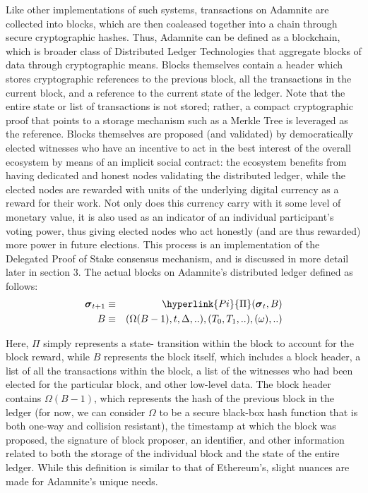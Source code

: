 \documentclass[conference]{IEEEtran}
\begin{document}
Like other implementations of such systems, transactions on Adamnite are collected into blocks, which are then coaleased together into a chain through secure cryptographic hashes. Thus, Adamnite can be defined as a blockchain, which is broader class of Distributed Ledger Technologies that aggregate blocks of data through cryptographic means.  Blocks themselves contain a header which stores cryptographic references to the previous block, all the transactions in the current block, and a reference to the current state of the ledger. Note that the entire state or list of transactions is not stored; rather, a compact cryptographic proof that points to a storage mechanism such as a Merkle Tree is leveraged as the reference. Blocks themselves are proposed (and validated)  by democratically elected witnesses who have an incentive to act in the best interest of the overall ecosystem by means of an implicit social contract: the ecosystem benefits from having dedicated and honest nodes validating the distributed ledger, while the elected nodes are rewarded with units of the underlying digital currency as a reward for their work. Not only does this currency carry with it some level of monetary value, it is also used as an indicator of an individual participant's voting power, thus giving elected nodes who act honestly (and are thus rewarded) more power in future elections. This process is an implementation of the Delegated Proof of Stake consensus mechanism, and is discussed in more detail later in section 3. The actual blocks on Adamnite's distributed ledger defined as follows:
\begin{eqnarray}
\boldsymbol{\sigma}_{t+1} & \equiv & \hyperlink{Pi}{\Pi}(\boldsymbol{\sigma}_{t}, B) \\
B & \equiv & (\Omega(B-1), t, \Delta,..), (T_0, T_1,..),
(\omega),..)
\end{eqnarray}

Here, $\Pi$ simply represents a state-
transition within the block to account for the block reward, while $B$ represents the block itself, which includes a block header, a list of all the transactions within the block, a list of the witnesses who had been elected for the particular block, and other low-level data. The block header contains $\Omega(B-1)$, which represents the hash of the previous block in the ledger (for now, we can consider $\Omega$ to be a secure black-box hash function that is both one-way and collision resistant), the timestamp at which the block was proposed, the signature of block proposer, an identifier, and other information related to both the storage of the individual block and the state of the entire ledger. While this definition is similar to that of Ethereum's, slight nuances are made for Adamnite's unique needs.
\end{document}
